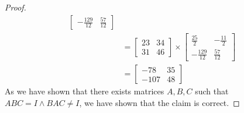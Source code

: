 \documentclass[11pt]{scrartcl}
\theoremstyle{dotlessP}
\theoremstyle{dotlessN}
\begin{document}
\begin{proof}
\begin{align*}
\begin{bmatrix}
	-\frac{129}{12} & \frac{57}{12}
\end{bmatrix} \\
			&= 
\begin{bmatrix}
	23	& 34 \\
	31 &	46
\end{bmatrix} \times
\begin{bmatrix}
	\frac{25}{2} & -\frac{11}{2} \\
	-\frac{129}{12} & \frac{57}{12}
\end{bmatrix} \\
			&= 
		\begin{bmatrix}
			-78	& 35 \\
			-107	& 48
		\end{bmatrix}
	\end{align*}
	As we have shown that there exists matrices $A,B,C$ such that $ABC = I \land BAC \neq I$, we have shown that the claim is correct.
\end{proof}
\end{document}
